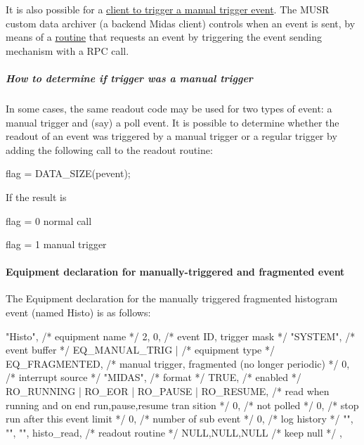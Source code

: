 It is also possible for a \hyperlink{FE_eq_event_routines_FE_backend_Manual_Trigger}{client to trigger a manual trigger event}. The MUSR custom data archiver (a backend Midas client) controls when an event is sent, by means of a \hyperlink{FE_eq_event_routines_FE_backend_Manual_Trigger}{routine} that requests an event by triggering the event sending mechanism with a RPC call.\hypertarget{FE_eq_event_routines_FE_manual_trig_determine}{}\subparagraph{How to determine if trigger was a manual trigger}\label{FE_eq_event_routines_FE_manual_trig_determine}
In some cases, the same readout code may be used for two types of event: a manual trigger and (say) a poll event. It is possible to determine whether the readout of an event was triggered by a manual trigger or a regular trigger by adding the following call to the readout routine: 
\begin{DoxyCode}
  flag = DATA_SIZE(pevent);
\end{DoxyCode}


\par
 If the result is
\begin{DoxyItemize}
\item flag = 0 normal call
\item flag = 1 manual trigger
\end{DoxyItemize}\hypertarget{FE_eq_event_routines_FE_tdmusr_equipment}{}\paragraph{Equipment declaration for manually-\/triggered and fragmented event}\label{FE_eq_event_routines_FE_tdmusr_equipment}
The Equipment declaration for the manually triggered fragmented histogram event (named Histo) is as follows:


\begin{DoxyCode}
 { "Histo",             /* equipment name */
    2, 0,                 /* event ID, trigger mask */
    "SYSTEM",             /* event buffer */
    EQ_MANUAL_TRIG |     /* equipment type */
    EQ_FRAGMENTED,        /*    manual trigger, fragmented (no longer periodic)
 */
    0,                    /* interrupt source */
    "MIDAS",               /* format */
    TRUE,                 /* enabled */
    RO_RUNNING | RO_EOR |
    RO_PAUSE | RO_RESUME, /* read when running and on end run,pause,resume tran
sition */
    0,                    /* not polled */
    0,                    /* stop run after this event limit */
    0,                    /* number of sub event */
    0,                    /* log history */
   "", "", "",
    histo_read,     /* readout routine */
    NULL,NULL,NULL       /* keep null */
  },
\end{DoxyCode}


